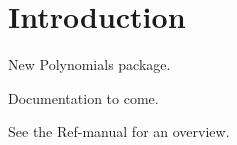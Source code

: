 

\section{Introduction}

New Polynomials package.

Documentation to come. 

See the Ref-manual for an overview. 